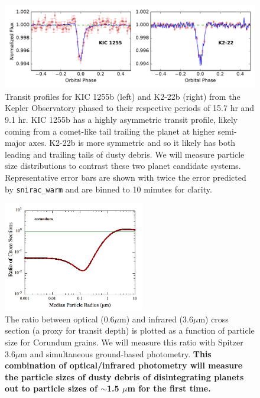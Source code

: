 \documentclass[letterpaper,12pt]{article}
\begin{document}
\begin{figure}
\centering
\includegraphics[width=1.0\textwidth]{transit_profiles.pdf}
\caption{Transit profiles for KIC 1255b (left) and K2-22b (right) from the Kepler Observatory phased to their respective periods of 15.7 hr and 9.1 hr. KIC 1255b has a highly asymmetric transit profile, likely coming from a comet-like tail trailing the planet at higher semi-major axes.
K2-22b is more symmetric and so it likely has both leading and trailing tails of dusty debris.
We will measure particle size distributions to contrast these two planet candidate systems.
Representative error bars are shown with twice the error predicted by \texttt{snirac\_warm} and are binned to 10 minutes for clarity.}\label{fig:TransitProfiles}
\end{figure}

\begin{figure}
\centering
\includegraphics[width=0.55\textwidth]{particle_size_constraints.png}
\caption{The ratio between optical (0.6$\mu$m) and infrared (3.6$\mu$m) cross section (a proxy for transit depth) is plotted as a function of particle size for Corundum grains. We will measure this ratio with Spitzer 3.6$\mu$m and simultaneous ground-based photometry. \textbf{This combination of optical/infrared photometry will measure the particle sizes of dusty debris of disintegrating planets out to particle sizes of $\sim$1.5 $\mu$m for the first time.}}\label{fig:SizeConstraints}
\end{figure}
\end{document}
